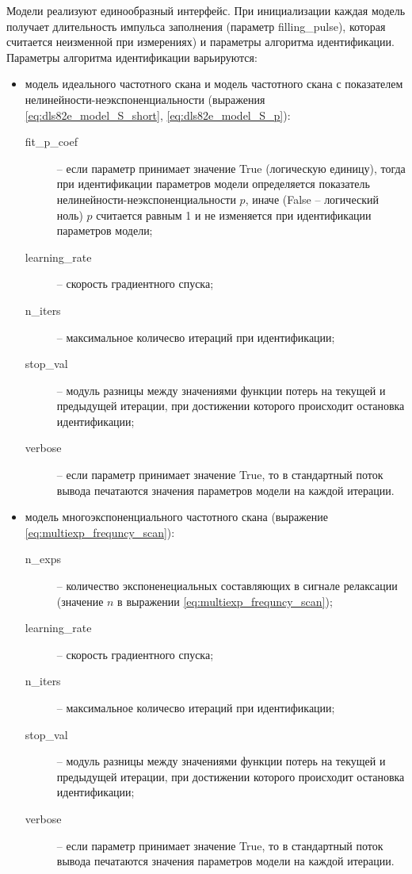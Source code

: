	Модели реализуют единообразный интерфейс. При инициализации каждая модель 
	получает длительность импульса заполнения (параметр filling\_pulse),
	которая считается неизменной при измерениях) и параметры алгоритма 
	идентификации. Параметры алгоритма идентификации варьируются:
	\begin{itemize}
		\item модель идеального частотного скана и модель частотного скана с 
		показателем нелинейности-неэкспоненциальности (выражения 
		\ref{eq:dls82e_model_S_short}, \ref{eq:dls82e_model_S_p}): 
			\begin{description}
				\item[fit\_p\_coef] -- если параметр принимает значение True 
				(логическую единицу), тогда при идентификации параметров модели
				определяется показатель нелинейности-неэкспоненциальности $p$,
				иначе (False -- логический ноль) $p$ считается равным 1 и не 
				изменяется при идентификации параметров модели;
				\item[learning\_rate] -- скорость градиентного спуска;
				\item[n\_iters] -- максимальное количесво итераций при 
				идентификации;
				\item[stop\_val] -- модуль разницы между значениями функции 
				потерь на текущей и предыдущей итерации, при достижении которого
				происходит остановка идентификации;
				\item[verbose] -- если параметр принимает значение True, то в 
				стандартный поток вывода печатаются значения параметров модели
				на каждой итерации.
			\end{description}

		\item модель многоэкспоненциального частотного скана (выражение 
		\ref{eq:multiexp_frequncy_scan}):
			\begin{description}
				\item[n\_exps] -- количество экспоненециальных составляющих в 
				сигнале релаксации (значение $n$ в выражении 
				\ref{eq:multiexp_frequncy_scan});
				\item[learning\_rate] -- скорость градиентного спуска;
				\item[n\_iters] -- максимальное количесво итераций при 
				идентификации;
				\item[stop\_val] -- модуль разницы между значениями функции 
				потерь на текущей и предыдущей итерации, при достижении которого
				происходит остановка идентификации;
				\item[verbose] -- если параметр принимает значение True, то в 
				стандартный поток вывода печатаются значения параметров модели
				на каждой итерации.
			\end{description}
	\end{itemize}

